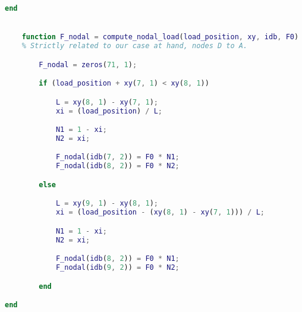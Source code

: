 \begin{lstlisting}[language=Matlab, caption={Implementation of the moving load dynamic analysis.}]
    end


    function F_nodal = compute_nodal_load(load_position, xy, idb, F0)
    % Strictly related to our case at hand, nodes D to A.

        F_nodal = zeros(71, 1);

        if (load_position + xy(7, 1) < xy(8, 1))

            L = xy(8, 1) - xy(7, 1);
            xi = (load_position) / L;

            N1 = 1 - xi;
            N2 = xi;

            F_nodal(idb(7, 2)) = F0 * N1;
            F_nodal(idb(8, 2)) = F0 * N2;

        else

            L = xy(9, 1) - xy(8, 1);
            xi = (load_position - (xy(8, 1) - xy(7, 1))) / L;

            N1 = 1 - xi;
            N2 = xi;

            F_nodal(idb(8, 2)) = F0 * N1;
            F_nodal(idb(9, 2)) = F0 * N2;

        end

end

\end{lstlisting}
